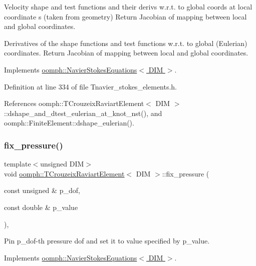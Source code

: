 Velocity shape and test functions and their derivs w.\+r.\+t. to global coords at local coordinate s (taken from geometry) Return Jacobian of mapping between local and global coordinates. 

Derivatives of the shape functions and test functions w.\+r.\+t. to global (Eulerian) coordinates. Return Jacobian of mapping between local and global coordinates. 

Implements \hyperlink{classoomph_1_1NavierStokesEquations_aeea4a1a3035ef93deaa68cc869e67dd8}{oomph\+::\+Navier\+Stokes\+Equations$<$ D\+I\+M $>$}.



Definition at line 334 of file Tnavier\+\_\+stokes\+\_\+elements.\+h.



References oomph\+::\+T\+Crouzeix\+Raviart\+Element$<$ D\+I\+M $>$\+::dshape\+\_\+and\+\_\+dtest\+\_\+eulerian\+\_\+at\+\_\+knot\+\_\+nst(), and oomph\+::\+Finite\+Element\+::dshape\+\_\+eulerian().

\mbox{\label{classoomph_1_1TCrouzeixRaviartElement_aacd1c1546b0fffef8c3d8ac27b4b0372}} 
\subsubsection{\texorpdfstring{fix\+\_\+pressure()}{fix\_pressure()}}
{\footnotesize\ttfamily template$<$unsigned D\+IM$>$ \\
void \hyperlink{classoomph_1_1TCrouzeixRaviartElement}{oomph\+::\+T\+Crouzeix\+Raviart\+Element}$<$ D\+IM $>$\+::fix\+\_\+pressure (\begin{DoxyParamCaption}\item[{const unsigned \&}]{p\+\_\+dof,  }\item[{const double \&}]{p\+\_\+value }\end{DoxyParamCaption})\hspace{0.3cm}{\ttfamily [inline]}, {\ttfamily [virtual]}}



Pin p\+\_\+dof-\/th pressure dof and set it to value specified by p\+\_\+value. 



Implements \hyperlink{classoomph_1_1NavierStokesEquations_aa33a3dd5c1cdba0a044e40ad290e487c}{oomph\+::\+Navier\+Stokes\+Equations$<$ D\+I\+M $>$}.




